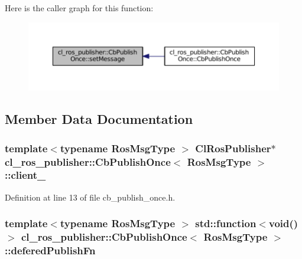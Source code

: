 Here is the caller graph for this function\+:
\nopagebreak
\begin{figure}[H]
\begin{center}
\leavevmode
\includegraphics[width=350pt]{classcl__ros__publisher_1_1CbPublishOnce_aedf3cb7940951d76773f46c807f34a58_icgraph}
\end{center}
\end{figure}




\subsection{Member Data Documentation}
\subsubsection[{\texorpdfstring{client\+\_\+}{client_}}]{\setlength{\rightskip}{0pt plus 5cm}template$<$typename Ros\+Msg\+Type $>$ {\bf Cl\+Ros\+Publisher}$\ast$ {\bf cl\+\_\+ros\+\_\+publisher\+::\+Cb\+Publish\+Once}$<$ Ros\+Msg\+Type $>$\+::client\+\_\+\hspace{0.3cm}{\ttfamily [private]}}\hypertarget{classcl__ros__publisher_1_1CbPublishOnce_aabb127ac2192a295ce9d11c63f3c9595}{}\label{classcl__ros__publisher_1_1CbPublishOnce_aabb127ac2192a295ce9d11c63f3c9595}


Definition at line 13 of file cb\+\_\+publish\+\_\+once.\+h.

\subsubsection[{\texorpdfstring{defered\+Publish\+Fn}{deferedPublishFn}}]{\setlength{\rightskip}{0pt plus 5cm}template$<$typename Ros\+Msg\+Type $>$ std\+::function$<$void()$>$ {\bf cl\+\_\+ros\+\_\+publisher\+::\+Cb\+Publish\+Once}$<$ Ros\+Msg\+Type $>$\+::defered\+Publish\+Fn\hspace{0.3cm}{\ttfamily [private]}}\hypertarget{classcl__ros__publisher_1_1CbPublishOnce_a6222a91fb87cd3118ca9f84ff857c696}{}\label{classcl__ros__publisher_1_1CbPublishOnce_a6222a91fb87cd3118ca9f84ff857c696}


